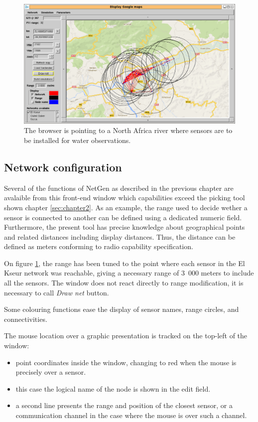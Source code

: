 \begin{figure}
\begin{center}
\includegraphics[width=12cm]{soummam1.png}
\caption{The browser is pointing to a North Africa river where sensors are to be installed
for water observations.}
\label{fig:soummam1}
\end{center}
\end{figure}

\subsection{Network configuration}

Several of the functions of NetGen as described in the previous chapter are avalaible from 
this front-end window which capabilities exceed the picking tool shown 
chapter \ref{sec:chapter2}. As an example, the range used to decide wether a sensor 
is connected to another can be defined using a dedicated numeric field. Furthermore, 
the present tool has precise knowledge about geographical points and related distances 
including display distances. Thus, the distance can be defined as meters conforming to 
radio capability specification. 

On figure \ref{fig:soummam1}, the range has been tuned to the point where each sensor 
in the El Kseur network was reachable, giving a necessary range of 3~000 meters to include 
all the sensors. The window does not react directly to range modification, 
it is necessary to call \emph{Draw net} button. 

Some colouring functions ease the display of sensor names, range circles, and connectivities. 

The mouse location over a graphic presentation is tracked on the top-left 
of the window: 

\begin{itemize}
\item point coordinates inside the window, changing to red when the mouse is precisely over 
  a sensor. 
\item this case the logical name of the node is shown in the edit field.
\item a second line presents the range and position of the closest sensor, 
or a communication channel in the case where the mouse is over such a channel.
\end{itemize}



